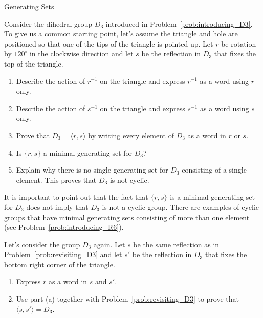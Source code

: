\begin{section}{Generating Sets}
\begin{problem}\label{prob:revisiting_D3}
Consider the dihedral group $D_3$ introduced in Problem~\ref{prob:introducing_D3}. To give us a common starting point, let's assume the triangle and hole are positioned so that one of the tips of the triangle is pointed up. Let $r$ be rotation by $120^\circ$ in the clockwise direction and let $s$ be the reflection in $D_3$ that fixes the top of the triangle.
\begin{enumerate}[label=\textrm{(\alph*)}]
\item Describe the action of $r^{-1}$ on the triangle and express $r^{-1}$ as a word using $r$ only.
\item Describe the action of $s^{-1}$ on the triangle and express $s^{-1}$ as a word using $s$ only.
\item Prove that $D_3=\langle r,s\rangle$ by writing every element of $D_3$ as a word in $r$ or $s$.
\item Is $\{r,s\}$ a minimal generating set for $D_3$?
\item Explain why there is no single generating set for $D_3$ consisting of a single element. This proves that $D_3$ is not cyclic.
\end{enumerate}
\end{problem}

It is important to point out that the fact that $\{r,s\}$ is a minimal generating set for $D_3$ does not imply that $D_3$ is not a cyclic group. There are examples of cyclic groups that have minimal generating sets consisting of more than one element (see Problem~\ref{prob:introducing_R6}).

\begin{problem}\label{prob:alternate_D3}
Let's consider the group $D_3$ again. Let $s$ be the same reflection as in Problem~\ref{prob:revisiting_D3} and let $s'$ be the reflection in $D_3$ that fixes the bottom right corner of the triangle.
\begin{enumerate}[label=\textrm{(\alph*)}]
\item Express $r$ as a word in $s$ and $s'$.
\item Use part (a) together with Problem~\ref{prob:revisiting_D3} to prove that $\langle s,s'\rangle=D_3$.
\end{enumerate}
\end{problem}


\end{section}
